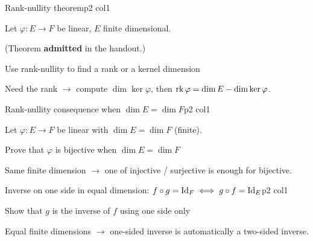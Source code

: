 \documentclass[sheet,noautoquant,noautokw]{neyvia-study}
\begin{document}
\begin{concept}[1.38]{Rank-nullity theorem}{p2 col1}
\begin{definition}
\noindent Let $\varphi:E\to F$ be linear, $E$ finite dimensional.
\par\noindent (Theorem \textbf{admitted} in the handout.)
\end{definition}
\begin{method}{Use rank-nullity to find a rank or a kernel dimension}
\end{method}
\begin{reflex}
Need the rank \ensuremath{\rightarrow} compute $\dim\ker\varphi$, then $\operatorname{rk}\varphi=\dim E-\dim\ker\varphi$.
\end{reflex}
\end{concept}
\begin{concept}[1.39]{Rank-nullity consequence when $\dim E=\dim F$}{p2 col1}
\begin{definition}
\noindent Let $\varphi:E\to F$ be linear with $\dim E=\dim F$ (finite).
\end{definition}
\begin{method}{Prove that $\varphi$ is bijective when $\dim E=\dim F$}
\end{method}
\begin{reflex}
Same finite dimension \ensuremath{\rightarrow} one of injective / surjective is enough for bijective.
\end{reflex}
\end{concept}
\begin{concept}[1.40]{Inverse on one side in equal dimension: $f\circ g=\mathrm{Id}_F\iff g\circ f=\mathrm{Id}_E$}{p2 col1}
\begin{definition}
\end{definition}
\begin{method}{Show that $g$ is the inverse of $f$ using one side only}
\end{method}
\begin{reflex}
Equal finite dimensions \ensuremath{\rightarrow} one-sided inverse is automatically a two-sided inverse.
\end{reflex}
\end{concept}
\end{document}
